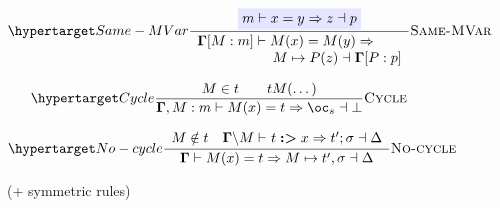 \begin{figure*}
\begin{raggedright}
{\begin{minipage}[t]{1\textwidth - 2\fboxsep - 2\fboxrule}
\begin{flushleft}
\begin{minipage}[t]{0.3\columnwidth}
\begin{flushleft}
%
\par\end{flushleft}%
\end{minipage}%
\begin{minipage}[t]{0.3\columnwidth}%
\begin{center}
\[
\labellabelrule{\dfrac{\highlighted{m\vdash x=y\Rightarrow z\dashv p}}{\begin{array}{r}
\dotmcontext{\Gamma}[M:m]\vdash M(x)=M(y)\Rightarrow\qquad\\
M\mapsto P(z)\dashv\dotmcontext{\Gamma}[P:p]
\end{array}}}{Same-MVar}
\]
\par\end{center}
\begin{center}
\[
\labellabelrule{\dfrac{M\in t\qquad t\neq M(\dots)}{\dotmcontext{\Gamma},M:m\vdash M(x)=t\Rightarrow\bang_{s}\dashv\bot}}{Cycle}
\]
\par\end{center}
\vspace{0.2em}
\[
\labellabelrule{\dfrac{\begin{array}{c}
M\notin t\quad\dotmcontext{\Gamma}\backslash M\prune tx{\sigma}{t'}\dashv\Delta\end{array}}{\dotmcontext{\Gamma}\vdash M(x)=t\Rightarrow M\mapsto t',\sigma\dashv\Delta}}{No-cycle}
\]

\begin{center}
\vspace{1em}(+ symmetric rules)
\par\end{center}%
\end{minipage}
\par\end{flushleft}
\vspace{0.2em}


\end{minipage}}
\end{raggedright}
\end{figure*}
